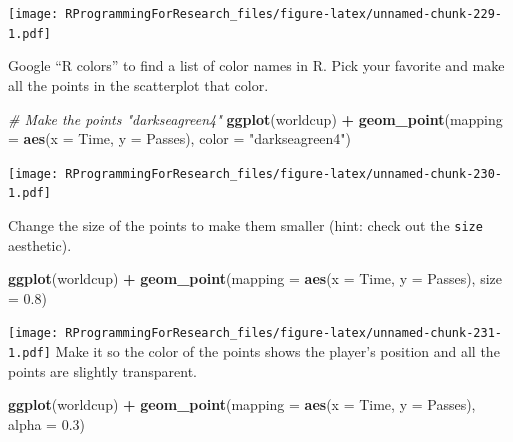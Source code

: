 \documentclass[]{book}
\makeatletter
\newenvironment{Shaded}{\begin{snugshade}}{\end{snugshade}}
\newcommand{\KeywordTok}[1]{\textcolor[rgb]{0.13,0.29,0.53}{\textbf{#1}}}
\newcommand{\DataTypeTok}[1]{\textcolor[rgb]{0.13,0.29,0.53}{#1}}
\newcommand{\FloatTok}[1]{\textcolor[rgb]{0.00,0.00,0.81}{#1}}
\newcommand{\StringTok}[1]{\textcolor[rgb]{0.31,0.60,0.02}{#1}}
\newcommand{\CommentTok}[1]{\textcolor[rgb]{0.56,0.35,0.01}{\textit{#1}}}
\newcommand{\OperatorTok}[1]{\textcolor[rgb]{0.81,0.36,0.00}{\textbf{#1}}}
\newcommand{\NormalTok}[1]{#1}
\newenvironment{kframe}{%
\medskip{}
\setlength{\fboxsep}{.8em}
 \def\at@end@of@kframe{}%
 \ifinner\ifhmode%
  \def\at@end@of@kframe{\end{minipage}}%
  \begin{minipage}{\columnwidth}%
 \fi\fi%
 \def\FrameCommand##1{\hskip\@totalleftmargin \hskip-\fboxsep
 \colorbox{shadecolor}{##1}\hskip-\fboxsep
     \hskip-\linewidth \hskip-\@totalleftmargin \hskip\columnwidth}%
 \MakeFramed {\advance\hsize-\width
   \@totalleftmargin\z@ \linewidth\hsize
   \@setminipage}}%
 {\par\unskip\endMakeFramed%
 \at@end@of@kframe}
\renewenvironment{Shaded}{\begin{kframe}}{\end{kframe}}
\theoremstyle{definition}
\theoremstyle{definition}
\theoremstyle{definition}
\theoremstyle{remark}
\makeatother
\begin{document}
\texttt{[image: RProgrammingForResearch\_files/figure-latex/unnamed-chunk-229-1.pdf]}

Google ``R colors'' to find a list of color names in R. Pick your
favorite and make all the points in the scatterplot that color.

\begin{Shaded}
\begin{Highlighting}[]
\CommentTok{# Make the points "darkseagreen4"}
\KeywordTok{ggplot}\NormalTok{(worldcup) }\OperatorTok{+}\StringTok{ }
\StringTok{  }\KeywordTok{geom_point}\NormalTok{(}\DataTypeTok{mapping =} \KeywordTok{aes}\NormalTok{(}\DataTypeTok{x =}\NormalTok{ Time, }\DataTypeTok{y =}\NormalTok{ Passes),}
             \DataTypeTok{color =} \StringTok{"darkseagreen4"}\NormalTok{)}
\end{Highlighting}
\end{Shaded}

\texttt{[image: RProgrammingForResearch\_files/figure-latex/unnamed-chunk-230-1.pdf]}

Change the size of the points to make them smaller (hint: check out the
\texttt{size} aesthetic).

\begin{Shaded}
\begin{Highlighting}[]
\KeywordTok{ggplot}\NormalTok{(worldcup) }\OperatorTok{+}\StringTok{ }
\StringTok{  }\KeywordTok{geom_point}\NormalTok{(}\DataTypeTok{mapping =} \KeywordTok{aes}\NormalTok{(}\DataTypeTok{x =}\NormalTok{ Time, }\DataTypeTok{y =}\NormalTok{ Passes),}
             \DataTypeTok{size =} \FloatTok{0.8}\NormalTok{)}
\end{Highlighting}
\end{Shaded}

\texttt{[image: RProgrammingForResearch\_files/figure-latex/unnamed-chunk-231-1.pdf]}
Make it so the color of the points shows the player's position and all
the points are slightly transparent.

\begin{Shaded}
\begin{Highlighting}[]
\KeywordTok{ggplot}\NormalTok{(worldcup) }\OperatorTok{+}\StringTok{ }
\StringTok{  }\KeywordTok{geom_point}\NormalTok{(}\DataTypeTok{mapping =} \KeywordTok{aes}\NormalTok{(}\DataTypeTok{x =}\NormalTok{ Time, }\DataTypeTok{y =}\NormalTok{ Passes),}
             \DataTypeTok{alpha =} \FloatTok{0.3}\NormalTok{)}
\end{Highlighting}
\end{Shaded}
\end{document}
